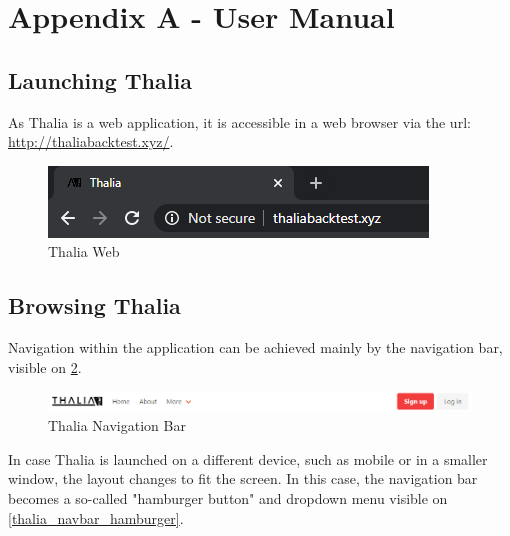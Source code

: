 \documentclass[main.tex]{subfiles}
\begin{document}
\section{Appendix A - User Manual}
\label{user_manual}
\subsection{Launching Thalia}
As Thalia is a web application, it is accessible in a web browser via the url: \url{http://thaliabacktest.xyz/}.



\begin{figure}[H]

   \centering

   \includegraphics[scale=0.8]{08Appendices/081User/081Pictures/thalia_domain.png}

   \caption{Thalia Web}

   \label{thalia_web}

\end{figure}

\subsection{Browsing Thalia}

Navigation within the application can be achieved mainly by the navigation bar, visible on \figurename{\ref{thalia_navbar}}.



\begin{figure}[H]

   \centering

   \includegraphics[width=\textwidth]{08Appendices/081User/081Pictures/navbar.png}

   \caption{Thalia Navigation Bar}

   \label{thalia_navbar}

\end{figure}



In case Thalia is launched on a different device, such as mobile or in a smaller window, the layout changes to fit the screen. In this case, the navigation bar becomes a so-called "hamburger button" and dropdown menu visible on \figurename{\ref{thalia_navbar_hamburger}}.
\end{document}
